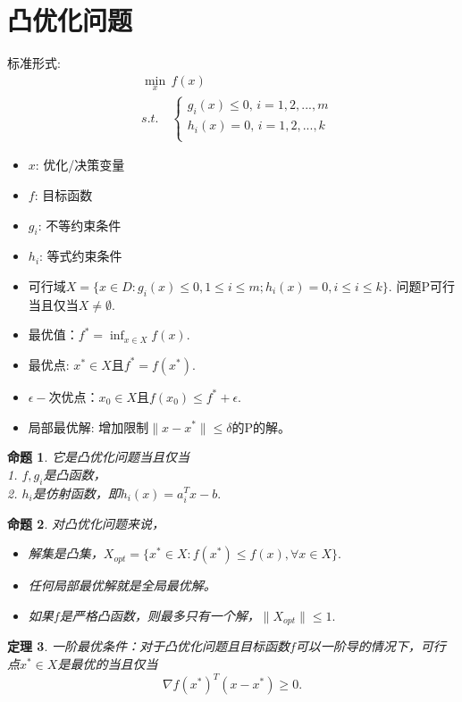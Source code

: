 \documentclass[12pt, a4paper, oneside]{ctexbook}
\newtheorem{theorem}{定理}[section]
\newtheorem{proposition}[theorem]{命题}
\begin{document}
\section{凸优化问题}
标准形式:
\begin{equation*}
    \begin{split}
    &\min_x \,f(x)\\
    &s.t.\quad  \left\{\begin{array}{lc}
        g_i(x)\leq 0,\, i=1,2,...,m\\
        h_i(x)=0,\, i=1,2,...,k\\
    \end{array}\right.
    \end{split}
\end{equation*}
\begin{itemize}
    \item $x$: 优化/决策变量
    \item $f$: 目标函数
    \item $g_i$: 不等约束条件
    \item $h_i$: 等式约束条件
    \item 可行域$X=\{x\in D:g_i(x)\leq0, 1\leq i\leq m;h_i(x)=0,i\leq i\leq k\}$.
    问题P可行当且仅当$X\neq\emptyset.$
    \item 最优值：$f^*=\inf_{x\in X}f(x).$
    \item 最优点: $x^*\in X$且$f^*=f(x^*).$
    \item $\epsilon-$次优点：$x_0\in X$且$f(x_0)\leq f^*+\epsilon.$
    \item 局部最优解: 增加限制$\|x-x^*\|\leq \delta$的P的解。
\end{itemize}
\begin{proposition}
    它是凸优化问题当且仅当\\
    1. $f,g_i$是凸函数，\\
    2. $h_i$是仿射函数，即$h_i(x)=a_i^Tx-b.$
\end{proposition}

\begin{proposition}
    对凸优化问题来说，
    \begin{itemize}
        \item 解集是凸集，$X_{opt}=\{x^*\in X:f(x^*)\leq f(x),\forall x\in X\}.$
        \item 任何局部最优解就是全局最优解。
        \item 如果$f$是严格凸函数，则最多只有一个解，$\|X_{opt}\|\leq1.$
    \end{itemize}
\end{proposition}

\begin{theorem}
    一阶最优条件：对于凸优化问题且目标函数$f$可以一阶导的情况下，可行点$x^*\in X$是最优的当且仅当
    $$\nabla f(x^*)^T(x-x^*)\geq 0.$$
\end{theorem}
\end{document}
